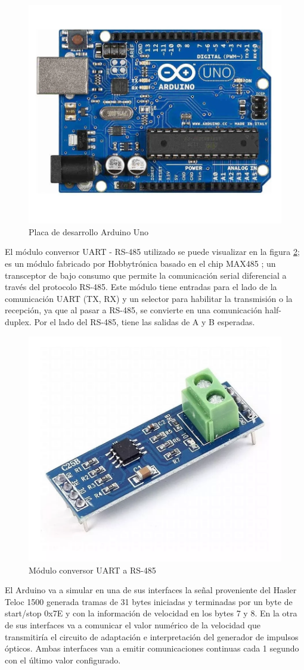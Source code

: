 \begin{figure}[H]
    \centering
    \includegraphics[width = 0.6 \linewidth]{img/arduino_uno.png}
    \caption{Placa de desarrollo Arduino Uno}
    \label{fig:arduino_uno}
\end{figure}


El módulo conversor UART - RS-485 utilizado se puede visualizar en la figura \ref{fig:conversor_uart_rs485}; es un módulo fabricado por Hobbytrónica \cite{hobbytronica} basado en el chip MAX485 \cite{max485}; un transceptor de bajo consumo que permite la comunicación serial diferencial a través del protocolo RS-485. Este módulo tiene entradas para el lado de la comunicación UART (TX, RX) y un selector para habilitar la transmisión o la recepción, ya que al pasar a RS-485, se convierte en una comunicación half-duplex. Por el lado del RS-485, tiene las salidas de A y B esperadas. 


\begin{figure}[H]
    \centering
    \includegraphics[width = 0.5\linewidth]{img/conversor_uart_rs485.png}
    \caption{Módulo conversor UART a RS-485}
    \label{fig:conversor_uart_rs485}
\end{figure}

El Arduino va a simular en una de sus interfaces la señal proveniente del Hasler Teloc 1500 generada tramas de 31 bytes iniciadas y terminadas por un byte de start/stop 0x7E y con la información de velocidad en los bytes 7 y 8. En la otra de sus interfaces va a comunicar el valor numérico de la velocidad que transmitiría el circuito de adaptación e interpretación del generador de impulsos ópticos. Ambas interfaces van a emitir comunicaciones continuas cada 1 segundo con el último valor configurado. \\ 

